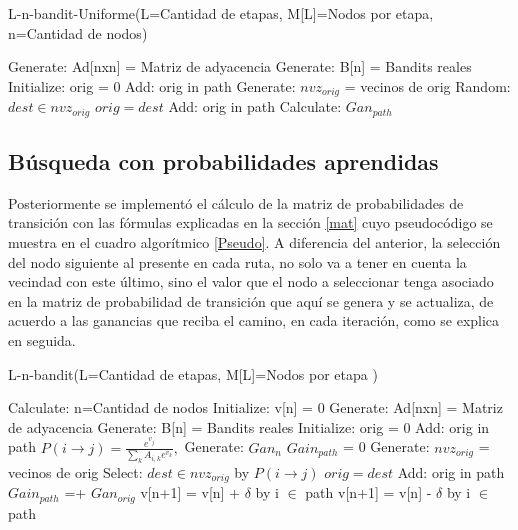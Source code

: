 \begin{algorithm} [h]
\caption{L-n-bandit-Uniforme(L=Cantidad de etapas, M[L]=Nodos por etapa,
n=Cantidad de nodos)} \label{PsUniforme}
\begin{algorithmic}[1]
\STATE Generate: Ad[nxn] = Matriz de adyacencia
\STATE Generate: B[n] = Bandits reales
     \STATE Initialize: orig = 0
     \STATE Add: orig in path
        \STATE Generate: $nvz_{orig}$ = vecinos de orig
        \STATE Random: ${dest \in nvz_{orig}}$
        \STATE $orig = dest$
        \STATE Add: orig in path
     \ENDFOR
     \STATE Calculate: $Gan_{path}$
\ENDFOR
\end{algorithmic}
\end{algorithm}

\subsection{Búsqueda con probabilidades aprendidas}
Posteriormente se implementó el cálculo de la matriz de probabilidades de transición con las fórmulas explicadas en la sección \ref{mat} cuyo pseudocódigo se muestra en el cuadro algorítmico \ref{Pseudo}. A diferencia del anterior, la selección del nodo siguiente al presente en cada ruta, no solo va a tener en cuenta la vecindad con este último, sino el valor que el nodo a seleccionar tenga asociado en la matriz de probabilidad de transición que aquí se genera y se actualiza, de acuerdo a las ganancias que reciba el camino, en cada iteración, como se explica en seguida.

\begin{algorithm}
\caption{L-n-bandit(L=Cantidad de etapas, M[L]=Nodos por etapa )
} 
\label{Pseudo}
\begin{algorithmic}[1]
\STATE Calculate: n=Cantidad de nodos
\STATE Initialize: v[n] = 0
\STATE Generate: Ad[nxn] = Matriz de adyacencia
\STATE Generate: B[n] = Bandits reales
     \STATE Initialize: orig = 0
     \STATE Add: orig in path
     \STATE $P(i \to j) = \frac{e^{v_j}}{\sum_k A_{i,k} e^{v_k}},$
     \STATE Generate: $Gan_{n}$
     \STATE $Gain_{path}$ = 0
        \STATE Generate: $nvz_{orig}$ = vecinos de orig
        \STATE Select: $dest \in nvz_{orig}$  by $P(i \to j)$
        \STATE $orig = dest$
        \STATE Add: orig in path
        \STATE $Gain_{path}$ =+ $Gan_{orig}$
     \ENDFOR
        \STATE v[n+1] = v[n] + $\delta$ by i $\in$ path
     \ELSE
        \STATE v[n+1] = v[n] - $\delta$ by i $\in$ path   
     \ENDIF    
\ENDFOR
\end{algorithmic}
\end{algorithm}

